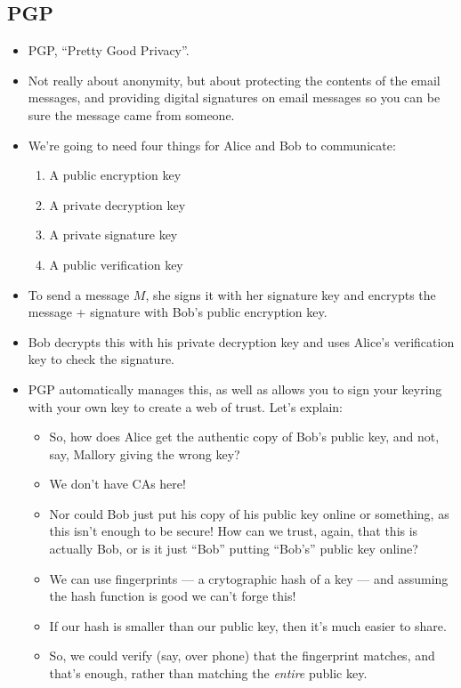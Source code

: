 \documentclass{article}
\begin{document}
\subsection{PGP}
\begin{itemize}
    \item PGP, ``Pretty Good Privacy''.
    \item Not really about anonymity, but about protecting the contents of the email messages, and providing digital signatures on email messages so you can be sure the message came from someone.
    \item We're going to need four things for Alice and Bob to communicate:
        \begin{enumerate}
            \item A public encryption key
            \item A private decryption key
            \item A private signature key
            \item A public verification key
        \end{enumerate}
    \item To send a message $M$, she signs it with her signature key and encrypts the message + signature with Bob's public encryption key.
    \item Bob decrypts this with his private decryption key and uses Alice's verification key to check the signature.
    \item PGP automatically manages this, as well as allows you to sign your keyring with your own key to create a web of trust.  Let's explain:
        \begin{itemize}
            \item So, how does Alice get the authentic copy of Bob's public key, and not, say, Mallory giving the wrong key?
            \item We don't have CAs here!
            \item Nor could Bob just put his copy of his public key online or something, as this isn't enough to be secure!  How can we trust, again, that this is actually Bob, or is it just ``Bob'' putting ``Bob's'' public key online?
            \item We can use fingerprints --- a crytographic hash of a key --- and assuming the hash function is good we can't forge this!
            \item If our hash is smaller than our public key, then it's much easier to share.
            \item So, we could verify (say, over phone) that the fingerprint matches, and that's enough, rather than matching the \emph{entire} public key.

\end{itemize}
\end{itemize}
\end{document}
